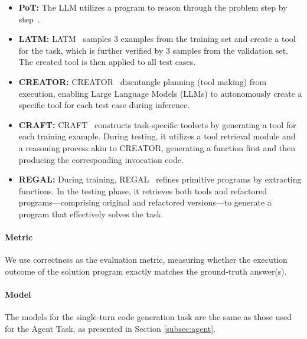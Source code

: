 \begin{itemize}
    \item \textbf{PoT:} The LLM utilizes a program to reason through the problem step by step~\citep{chen2022program}.
   \item \textbf{LATM:} LATM~\citep{cai2023large} samples 3 examples from the training set and create a tool for the task, which is further verified by 3 samples from the validation set. The created tool is then applied to all test cases.
    \item \textbf{CREATOR:} CREATOR~\citep{qian2023creator} disentangle planning (tool making) from execution, enabling Large Language Models (LLMs) to autonomously create a specific tool for each test case during inference.
     \item \textbf{CRAFT:} CRAFT~\citep{yuan2023craft} constructs task-specific toolsets by generating a tool for each training example. During testing, it utilizes a tool retrieval module and a reasoning process akin to CREATOR, generating a function first and then producing the corresponding invocation code. 
      \item \textbf{REGAL:} During training, REGAL~\citep{stengel2024regal} refines primitive programs by extracting functions. In the testing phase, it retrieves both tools and refactored programs—comprising original and refactored versions—to generate a program that effectively solves the task. 
\end{itemize}
\paragraph{Metric}
We use correctness as the evaluation metric, measuring whether the execution outcome of the solution program exactly matches the ground-truth answer(s).
\paragraph{Model}
The models for the single-turn code generation task are the same as those used for the Agent Task, as presented in Section \ref{subsec:agent}.
